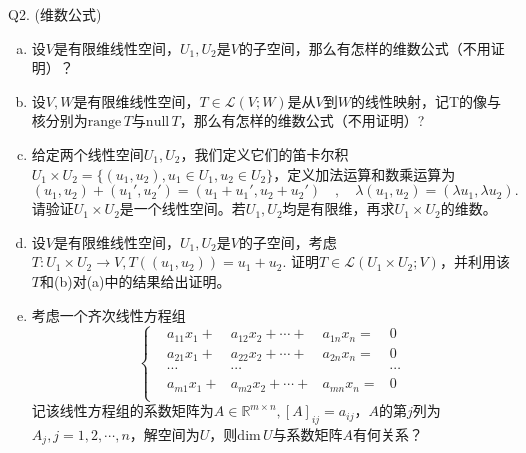 \documentclass[12pt]{article}
\begin{document}
\bigskip

\noindent{} Q2. (维数公式)
\begin{enumerate}[(a)]
\item 设$V$是有限维线性空间，$U_1,U_2$是$V$的子空间，那么有怎样的维数公式（不用证明）？
\item 设$V,W$是有限维线性空间，$T\in\mathcal{L}(V;W)$是从$V$到$W$的线性映射，记T的像与核分别为$\mathrm{range}\,T$与$\mathrm{null}\,T$，那么有怎样的维数公式（不用证明）?
\item 给定两个线性空间$U_1,U_2$，我们定义它们的笛卡尔积$U_1\times U_2=\{(u_1,u_2),u_1\in U_1,u_2\in U_2\}$，定义加法运算和数乘运算为
\[(u_1,u_2)+(u_1',u_2')=(u_1+u_1',u_2+u_2')\quad,\quad \lambda(u_1,u_2)=(\lambda u_1,\lambda u_2).\]
请验证$U_1\times U_2$是一个线性空间。若$U_1,U_2$均是有限维，再求$U_1\times U_2$的维数。
\item 设$V$是有限维线性空间，$U_1,U_2$是$V$的子空间，考虑$T:U_1\times U_2\rightarrow V, T((u_1,u_2))=u_1+u_2$. 证明$T\in\mathcal{L}(U_1\times U_2;V)$，并利用该$T$和(b)对(a)中的结果给出证明。
\item 考虑一个齐次线性方程组
\[\left\{
\begin{aligned}
&a_{11}x_1 + &a_{12}x_2 +\cdots+&a_{1n}x_n =& 0\\
&a_{21}x_1 + &a_{22}x_2 +\cdots+&a_{2n}x_n = &0\\
&\cdots&\cdots&&\cdots\\
&a_{m1}x_1 + &a_{m2}x_2 +\cdots+&a_{mn}x_n = &0\\
\end{aligned}\right.
\]
记该线性方程组的系数矩阵为$A\in\mathbb{R}^{m\times n}, [A]_{ij}=a_{ij}$，$A$的第$j$列为$A_j,j=1,2,\cdots,n$，解空间为$U$，则$\mathrm{dim}\, U$与系数矩阵$A$有何关系？

\end{enumerate}
\end{document}
